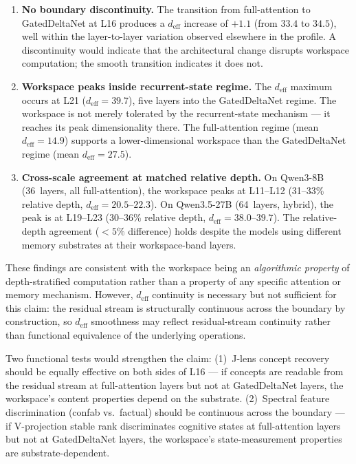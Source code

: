 \begin{enumerate}[nosep]
\item \textbf{No boundary discontinuity.} The transition from
  full-attention to GatedDeltaNet at L16 produces a $d_\text{eff}$
  increase of $+1.1$ (from $33.4$ to $34.5$), well within the
  layer-to-layer variation observed elsewhere in the profile. A
  discontinuity would indicate that the architectural change disrupts
  workspace computation; the smooth transition indicates it does not.

\item \textbf{Workspace peaks inside recurrent-state regime.} The
  $d_\text{eff}$ maximum occurs at L21 ($d_\text{eff}{=}39.7$),
  five layers into the GatedDeltaNet regime. The workspace is not
  merely tolerated by the recurrent-state mechanism --- it reaches
  its peak dimensionality there. The full-attention regime (mean
  $d_\text{eff}{=}14.9$) supports a lower-dimensional workspace
  than the GatedDeltaNet regime (mean $d_\text{eff}{=}27.5$).

\item \textbf{Cross-scale agreement at matched relative depth.}
  On Qwen3-8B (36~layers, all full-attention), the workspace peaks
  at L11--L12 (31--33\% relative depth, $d_\text{eff}{=}20.5$--$22.3$).
  On Qwen3.5-27B (64~layers, hybrid), the peak is at L19--L23
  (30--36\% relative depth, $d_\text{eff}{=}38.0$--$39.7$). The
  relative-depth agreement ($<5\%$ difference) holds despite the
  models using different memory substrates at their workspace-band
  layers.
\end{enumerate}

These findings are consistent with the workspace being an
\emph{algorithmic property} of depth-stratified computation rather
than a property of any specific attention or memory mechanism.
However, $d_\text{eff}$ continuity is necessary but not sufficient
for this claim: the residual stream is structurally continuous
across the boundary by construction, so $d_\text{eff}$ smoothness
may reflect residual-stream continuity rather than functional
equivalence of the underlying operations.

Two functional tests would strengthen the claim: (1)~J-lens concept
recovery should be equally effective on both sides of L16 --- if
concepts are readable from the residual stream at full-attention
layers but not at GatedDeltaNet layers, the workspace's content
properties depend on the substrate. (2)~Spectral feature
discrimination (confab vs.\ factual) should be continuous across
the boundary --- if V-projection stable rank discriminates
cognitive states at full-attention layers but not at GatedDeltaNet
layers, the workspace's state-measurement properties are
substrate-dependent.

